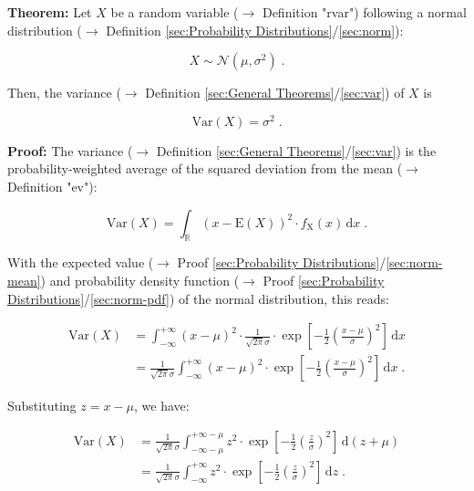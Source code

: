 \documentclass[a4paper,12pt]{book}
\begin{document}
\vspace{1em}
\textbf{Theorem:} Let $X$ be a random variable ($\rightarrow$ Definition "rvar") following a normal distribution ($\rightarrow$ Definition \ref{sec:Probability Distributions}/\ref{sec:norm}):

\begin{equation} \label{eq:norm-var-norm}
X \sim \mathcal{N}(\mu, \sigma^2) \; .
\end{equation}

Then, the variance ($\rightarrow$ Definition \ref{sec:General Theorems}/\ref{sec:var}) of $X$ is

\begin{equation} \label{eq:norm-var-norm-mode}
\mathrm{Var}(X) = \sigma^2 \; .
\end{equation}


\vspace{1em}
\textbf{Proof:} The variance ($\rightarrow$ Definition \ref{sec:General Theorems}/\ref{sec:var}) is the probability-weighted average of the squared deviation from the mean ($\rightarrow$ Definition "ev"):

\begin{equation} \label{eq:norm-var-var}
\mathrm{Var}(X) = \int_{\mathbb{R}} (x - \mathrm{E}(X))^2 \cdot f_\mathrm{X}(x) \, \mathrm{d}x \; .
\end{equation}

With the expected value ($\rightarrow$ Proof \ref{sec:Probability Distributions}/\ref{sec:norm-mean}) and probability density function ($\rightarrow$ Proof \ref{sec:Probability Distributions}/\ref{sec:norm-pdf}) of the normal distribution, this reads:

\begin{equation} \label{eq:norm-var-norm-var-s1}
\begin{split}
\mathrm{Var}(X) &= \int_{-\infty}^{+\infty} (x - \mu)^2 \cdot \frac{1}{\sqrt{2 \pi} \sigma} \cdot \exp \left[ -\frac{1}{2} \left( \frac{x-\mu}{\sigma} \right)^2 \right] \, \mathrm{d}x \\
&= \frac{1}{\sqrt{2 \pi} \sigma} \int_{-\infty}^{+\infty} (x - \mu)^2 \cdot \exp \left[ -\frac{1}{2} \left( \frac{x-\mu}{\sigma} \right)^2 \right] \, \mathrm{d}x \; .
\end{split}
\end{equation}

Substituting $z = x -\mu$, we have:

\begin{equation} \label{eq:norm-var-norm-var-s2}
\begin{split}
\mathrm{Var}(X) &= \frac{1}{\sqrt{2 \pi} \sigma} \int_{-\infty-\mu}^{+\infty-\mu} z^2 \cdot \exp \left[ -\frac{1}{2} \left( \frac{z}{\sigma} \right)^2 \right] \, \mathrm{d}(z + \mu) \\
&= \frac{1}{\sqrt{2 \pi} \sigma} \int_{-\infty}^{+\infty} z^2 \cdot \exp \left[ -\frac{1}{2} \left( \frac{z}{\sigma} \right)^2 \right] \, \mathrm{d}z \; .
\end{split}
\end{equation}
\end{document}
